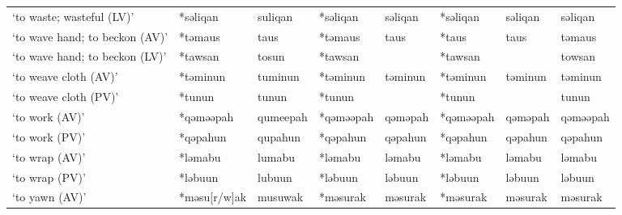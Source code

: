 \begin{landscape}
\begin{longtable}[c]{@{}p{3cm}<{\raggedright}p{2.75cm}<{\raggedright}p{2.75cm}<{\raggedright}p{2.75cm}<{\raggedright}p{2.75cm}<{\raggedright}p{2.75cm}<{\raggedright}p{2.75cm}<{\raggedright}p{2.75cm}<{\raggedright}@{}}
`to waste; wasteful (LV)'                            & *səliqan     & suliqan                       & *səliqan       & səliqan                    & *səliqan         & səliqan                  & səliqan                           \\
`to wave hand; to beckon (AV)'                       & *təmaus      & taus                          & *təmaus        & taus                       & *taus            & taus                     & təmaus                            \\
`to wave hand; to beckon (LV)'                       & *tawsan      & tosun                         & *tawsan        &                            & *tawsan          &                          & towsan                            \\
`to weave cloth (AV)'                                & *təminun     & tuminun                       & *təminun       & təminun                    & *təminun         & təminun                  & təminun                           \\
`to weave cloth (PV)'                                & *tunun       & tunun                         & *tunun         &                            & *tunun           &                          & tunun                             \\
`to work (AV)'                                       & *qəməəpah    & qumeepah                      & *qəməəpah      & qəməpah                    & *qəməəpah        & qəməpah                  & qəməəpah                          \\
`to work (PV)'                                       & *qəpahun     & qupahun                       & *qəpahun       & qəpahun                    & *qəpahun         & qəpahun                  & qəpahun                           \\
`to wrap (AV)'                                       & *ləmabu      & lumabu                        & *ləmabu        & ləmabu                     & *ləmabu          & ləmabu                   & ləmabu                            \\
`to wrap (PV)'                                       & *ləbuun      & lubuun                        & *ləbuun        & ləbuun                     & *ləbuun          & ləbuun                   & ləbuun                            \\
`to yawn (AV)'                                       & *məsu[r/w]ak & musuwak                       & *məsurak       & məsurak                    & *məsurak         & məsurak                  & məsurak                           \\

\end{longtable}
\end{landscape}
